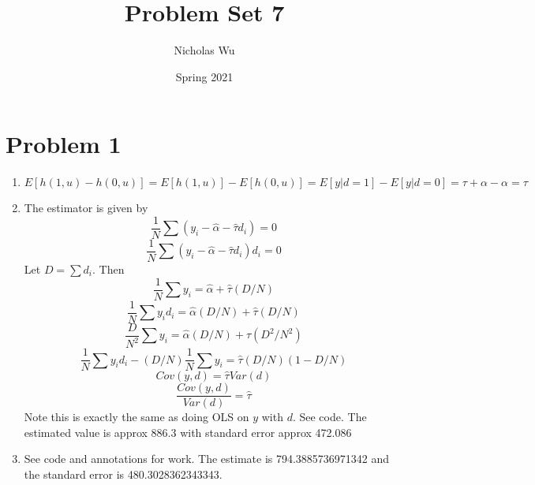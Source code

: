\documentclass[10pt,letter]{article}
\begin{document}


\title{Problem Set 7}

\author{Nicholas Wu}

\date{Spring 2021}

\maketitle


\section*{Problem 1}
\begin{enumerate}[label=(\alph*)]
\item \[ E[h(1,u) - h(0,u)] = E[h(1,u)] - E[h(0,u)] = E[y|d=1] - E[y|d=0] = \tau + \alpha  - \alpha = \tau \]
\item The estimator is given by
\[ \frac{1}{N}\sum (y_i - \hat{\alpha} - \hat{\tau}d_i) = 0 \]
\[ \frac{1}{N}\sum (y_i - \hat{\alpha} - \hat{\tau}d_i)d_i = 0 \]
Let $D = \sum d_i$. Then
\[ \frac{1}{N}\sum y_i = \hat{\alpha} + \hat{\tau}(D/N)  \]
\[ \frac{1}{N}\sum y_id_i = \hat{\alpha}(D/N) + \hat{\tau}(D/N)  \]
\[ \frac{D}{N^2}\sum y_i = \hat{\alpha}(D/N) + \hat{\tau}(D^2/N^2)  \]
\[ \frac{1}{N}\sum y_id_i - (D/N)\frac{1}{N}\sum y_i  = \hat{\tau}(D/N)(1 - D/N)  \]
\[ Cov(y, d) = \hat{\tau} Var(d) \]
\[ \frac{Cov(y, d)}{Var(d)} = \hat{\tau} \]
Note this is exactly the same as doing OLS on $y$ with $d$. See code. The estimated value is approx 886.3 with standard error approx 472.086
\item See code and annotations for work. The estimate is 794.3885736971342 and the standard error is 480.3028362343343.
\end{enumerate}
\end{document}
